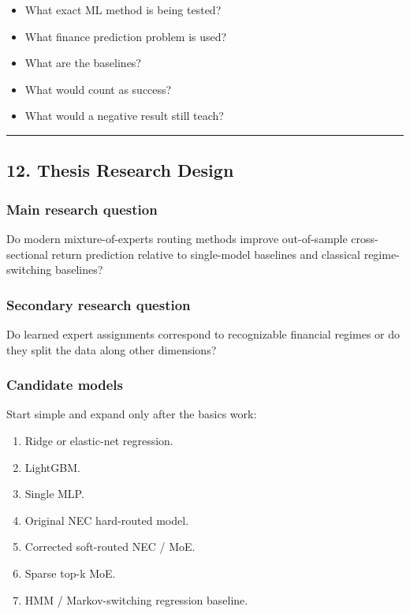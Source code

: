 \begin{enumerate}
  \begin{itemize}
  \tightlist
  \item
    What exact ML method is being tested?
  \item
    What finance prediction problem is used?
  \item
    What are the baselines?
  \item
    What would count as success?
  \item
    What would a negative result still teach?
  \end{itemize}
\end{enumerate}

\begin{center}\rule{0.5\linewidth}{0.5pt}\end{center}

\subsection{12. Thesis Research Design}\label{thesis-research-design}

\subsubsection{Main research question}\label{main-research-question}

Do modern mixture-of-experts routing methods improve out-of-sample
cross-sectional return prediction relative to single-model baselines and
classical regime-switching baselines?

\subsubsection{Secondary research
question}\label{secondary-research-question}

Do learned expert assignments correspond to recognizable financial
regimes or do they split the data along other dimensions?

\subsubsection{Candidate models}\label{candidate-models}

Start simple and expand only after the basics work:

\begin{enumerate}
\def\labelenumi{\arabic{enumi}.}
\tightlist
\item
  Ridge or elastic-net regression.
\item
  LightGBM.
\item
  Single MLP.
\item
  Original NEC hard-routed model.
\item
  Corrected soft-routed NEC / MoE.
\item
  Sparse top-k MoE.
\item
  HMM / Markov-switching regression baseline.
\end{enumerate}

